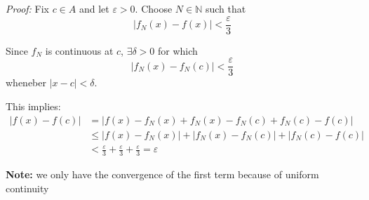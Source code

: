 \documentclass[12pt]{report}
\newcommand{\R}{\mathbb{R}}
\newcommand{\N}{\mathbb{N}}
\newcommand{\abs}[1]{\left\vert #1 \right\vert}
\newcommand{\ep}{\varepsilon}
\newenvironment*{tbox}[2][gray]{
    \begin{tcolorbox}[
        parbox=false,
        colback=#1!5!white,
        colframe=#1!75!black,
        breakable,
        title={#2}
    ]}
    {\end{tcolorbox}}
\begin{document}
        \begin{tbox}{\textbf{Theorem (Continuous Limit Theorem):} Let $(f_n)$ be a sequence of functions defined on $A \subseteq \R$ that converges uniformly on $A$ to a function $f$. If each $f_n$ is continuous at $c \in A$, then $f$ is continuous at $c$.}
            \emph{Proof:} Fix $c \in A$ and let $\ep > 0$. Choose $N \in \N$ such that 
            \[\abs{f_N(x) - f(x)} < \frac{\ep}{3}\]

            Since $f_N$ is continuous at $c$, $\exists \delta > 0$ for which 
            \[\abs{f_N(x) - f_N(c)} < \frac{\ep}{3}\]
            wheneber $\abs{x - c} < \delta$. 

            This implies:
            \begin{align*}
                \abs{f(x) - f(c)} &= \abs{f(x) - f_N(x) + f_N(x) - f_N(c) + f_N(c) - f(c)}\\
                &\leq \abs{f(x) - f_N(x)} + \abs{f_N(x) - f_N(c)} + \abs{f_N(c) - f(c)}\\
                &< \frac{\ep}{3} + \frac{\ep}{3} + \frac{\ep}{3} = \ep
            \end{align*}
        
            \textbf{Note:} we only have the convergence of the first term because of uniform continuity 
        \end{tbox}
\end{document}
